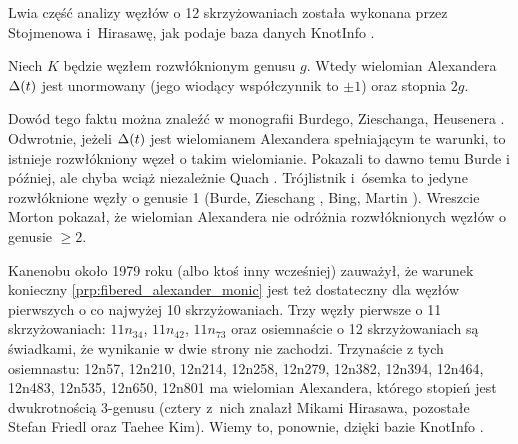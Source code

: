 Lwia część analizy węzłów o 12 skrzyżowaniach została wykonana przez Stojmenowa i~Hirasawę, jak podaje baza danych KnotInfo \cite{knotinfo2024}.
%
%

\begin{proposition}
%
\label{prp:fibered_alexander_monic}%
    Niech $K$ będzie węzłem rozwłóknionym genusu $g$.
    Wtedy wielomian Alexandera $\Delta(t)$ jest unormowany (jego wiodący współczynnik to $\pm 1$) oraz stopnia $2g$.
\end{proposition}

Dowód tego faktu można znaleźć w monografii Burdego, Zieschanga, Heusenera \cite[s. 130]{burde2014}.
Odwrotnie, jeżeli $\Delta(t)$ jest wielomianem Alexandera spełniającym te warunki, to istnieje rozwłókniony węzeł o takim wielomianie.
Pokazali to dawno temu Burde \cite{burde1966} i później, ale chyba wciąż niezależnie Quach \cite{quach1979}.
Trójlistnik i~ósemka to jedyne rozwłóknione węzły o genusie 1 (Burde, Zieschang \cite{burde1967}, Bing, Martin \cite{bing1971}).
Wreszcie Morton \cite{morton1983} pokazał, że wielomian Alexandera nie odróżnia rozwłóknionych węzłów o genusie $\ge 2$.


Kanenobu około 1979 roku (albo ktoś inny wcześniej) zauważył, że warunek konieczny \ref{prp:fibered_alexander_monic} jest też dostateczny dla węzłów pierwszych o co najwyżej 10 skrzyżowaniach.
Trzy węzły pierwsze o 11 skrzyżowaniach: $11n_{34}$, $11n_{42}$, $11n_{73}$ oraz osiemnaście o 12 skrzyżowaniach są świadkami, że wynikanie w dwie strony nie zachodzi.
Trzynaście z tych osiemnastu: 12n57, 12n210, 12n214, 12n258, 12n279, 12n382, 12n394, 12n464, 12n483, 12n535, 12n650, 12n801 ma wielomian Alexandera, którego stopień jest dwukrotnością 3-genusu (cztery z~nich znalazł Mikami Hirasawa, pozostałe Stefan Friedl oraz Taehee Kim).
%
%
%
Wiemy to, ponownie, dzięki bazie KnotInfo \cite{knotinfo2024}.

